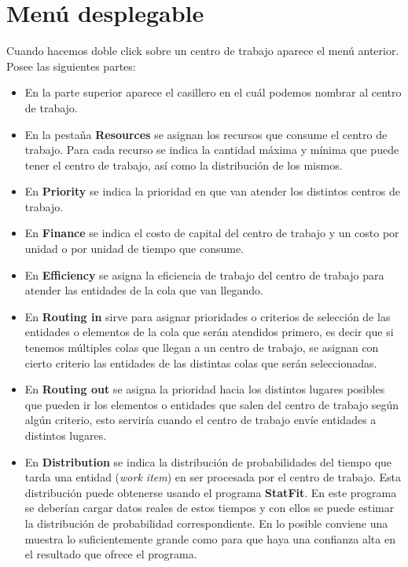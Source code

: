 \documentclass[runningheads]{llncs}
\begin{document}
\section{Menú desplegable}
Cuando hacemos doble click sobre un centro de trabajo aparece el menú anterior. Posee las siguientes partes:
\begin{itemize}
    \item En la parte superior aparece el casillero en el cuál podemos nombrar al centro de trabajo.
    \item En la pestaña \textbf{Resources} se asignan los recursos que consume el centro de trabajo. Para cada recurso se indica la cantidad máxima y mínima que puede tener el centro de trabajo, así como la distribución de los mismos.
    \item En \textbf{Priority} se indica la prioridad en que van atender los distintos centros de trabajo.
    \item En \textbf{Finance} se indica el costo de capital del centro de trabajo y un costo por unidad o por unidad de tiempo que consume.
    \item En \textbf{Efficiency} se asigna la eficiencia de trabajo del centro de trabajo para atender las entidades de la cola que van llegando.
    \item En \textbf{Routing in} sirve para asignar prioridades o criterios de selección de las entidades o elementos de la cola que serán atendidos primero, es decir que si tenemos múltiples colas que llegan a un centro de trabajo, se asignan con cierto criterio las entidades de las distintas colas que serán seleccionadas.
    \item En \textbf{Routing out} se asigna la prioridad hacia los distintos lugares posibles que pueden ir los elementos o entidades que salen del centro de trabajo según algún criterio, esto serviría cuando el centro de trabajo envíe entidades a distintos lugares.
    \item En \textbf{Distribution} se indica la distribución de probabilidades del tiempo que tarda una entidad (\textit{work item}) en ser procesada por el centro de trabajo. Esta distribución puede obtenerse usando el programa \textbf{StatFit}. En este programa se deberían cargar datos reales de estos tiempos y con ellos se puede estimar la distribución de probabilidad correspondiente. En lo posible conviene una muestra lo suficientemente grande como para que haya una confianza alta en el resultado que ofrece el programa.
\end{itemize}
\end{document}
